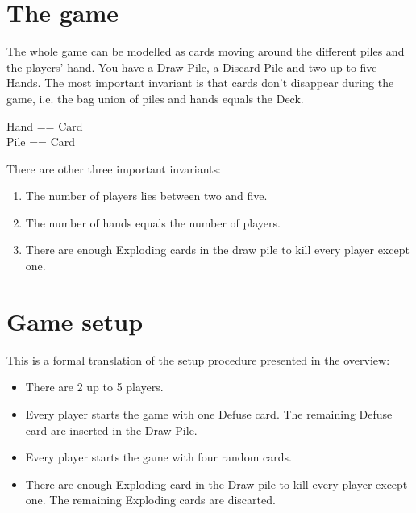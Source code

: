 \documentclass[11pt, fuzz]{article}
\begin{document}
\section{The game}

The whole game can be modelled as cards moving around the different piles and the players' hand. You have a Draw Pile, a Discard Pile and two up to five Hands. The most important invariant is that cards don't disappear during the game, i.e. the bag union of piles and hands equals the Deck. 

\begin{zed}
Hand == \bag Card \\
Pile == \seq Card \\
\end{zed}


There are other three important invariants:

\begin{enumerate}
    \item The number of players lies between two and five. 
    \item The number of hands equals the number of players. 
    \item There are enough Exploding cards in the draw pile to kill every player except one. 
\end{enumerate}

\section{Game setup}

This is a formal translation of the setup procedure presented in the overview:

\begin{itemize}
    \item There are 2 up to 5 players. 
    \item Every player starts the game with one Defuse card. The remaining Defuse card are inserted in the Draw Pile. 
    \item Every player starts the game with four random cards. 
    \item There are enough Exploding card in the Draw pile to kill every player except one. The remaining Exploding cards are discarted. 
\end{itemize}
\end{document}
